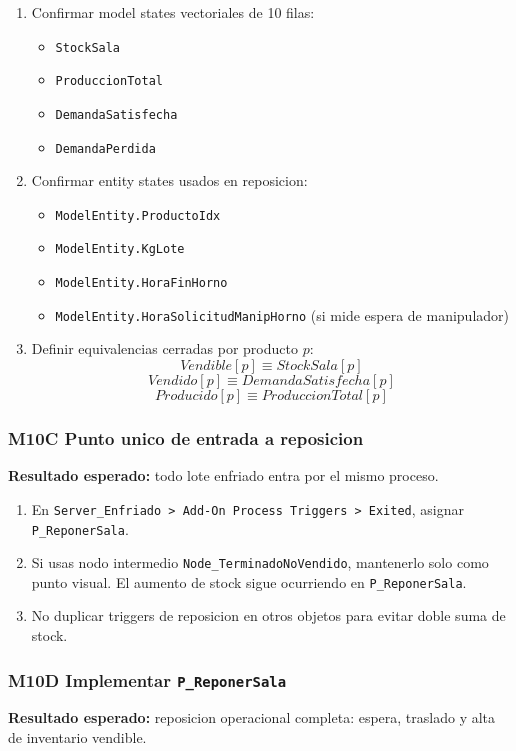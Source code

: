 \documentclass[11pt]{article}
\newcommand{\simio}[1]{\texttt{#1}}
\newcommand{\state}[1]{\texttt{#1}}
\newcommand{\proc}[1]{\texttt{#1}}
\begin{document}
\begin{enumerate}
  \item Confirmar model states vectoriales de 10 filas:
  \begin{itemize}
    \item \state{StockSala}
    \item \state{ProduccionTotal}
    \item \state{DemandaSatisfecha}
    \item \state{DemandaPerdida}
  \end{itemize}
  \item Confirmar entity states usados en reposicion:
  \begin{itemize}
    \item \state{ModelEntity.ProductoIdx}
    \item \state{ModelEntity.KgLote}
    \item \state{ModelEntity.HoraFinHorno}
    \item \state{ModelEntity.HoraSolicitudManipHorno} (si mide espera de manipulador)
  \end{itemize}
  \item Definir equivalencias cerradas por producto \(p\):
  \[
  Vendible[p] \equiv StockSala[p]
  \]
  \[
  Vendido[p] \equiv DemandaSatisfecha[p]
  \]
  \[
  Producido[p] \equiv ProduccionTotal[p]
  \]
\end{enumerate}

\subsubsection{M10C Punto unico de entrada a reposicion}
\textbf{Resultado esperado:} todo lote enfriado entra por el mismo proceso.

\begin{enumerate}
  \item En \simio{Server\_Enfriado > Add-On Process Triggers > Exited}, asignar \proc{P\_ReponerSala}.
  \item Si usas nodo intermedio \simio{Node\_TerminadoNoVendido}, mantenerlo solo como punto visual. El aumento de stock sigue ocurriendo en \proc{P\_ReponerSala}.
  \item No duplicar triggers de reposicion en otros objetos para evitar doble suma de stock.
\end{enumerate}

\subsubsection{M10D Implementar \proc{P\_ReponerSala}}
\textbf{Resultado esperado:} reposicion operacional completa: espera, traslado y alta de inventario vendible.
\end{document}
